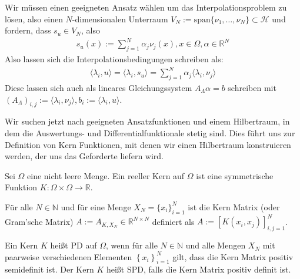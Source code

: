 Wir müssen einen geeigneten Ansatz wählen um das Interpolationsproblem zu lösen, also einen $N$-dimensionalen Unterraum $V_N := \text{span}\{\nu_1, \dots, \nu_N\} \subset \mathcal{H}$ und fordern, dass $s_u \in V_N$, also 
\begin{align*}
s_u(x) := \sum_{j=1}^N \alpha_j \nu_j(x), x \in \Omega, \alpha \in \mathbb{R}^N
\end{align*}
Also lassen sich die Interpolationsbedingungen schreiben als:
\begin{align*}
\langle \lambda_i,u \rangle = \langle \lambda_i,s_u \rangle = \sum_{j=1}^N \alpha_j \langle \lambda_i,\nu_j \rangle
\end{align*}
Diese lassen sich auch als lineares Gleichungssystem $A_\Lambda \alpha = b$ schreiben  mit $(A_\Lambda)_{i,j} := \langle \lambda_i,\nu_j \rangle, b_i := \langle \lambda_i,u \rangle$.

Wir suchen jetzt nach geeigneten Ansatzfunktionen und einem Hilbertraum, in dem die Auswertungs- und Differentialfunktionale stetig sind. Dies führt uns zur Definition von Kern Funktionen, mit denen wir einen Hilbertraum konstruieren werden, der uns das Geforderte liefern wird.

\begin{definition}
\label{Kern}
Sei $\Omega$ eine nicht leere Menge. Ein reeller Kern auf $\Omega$ ist eine symmetrische Funktion $K: \Omega \times \Omega \rightarrow \mathbb{R}$.

Für alle $N \in \mathbb{N}$ und für eine Menge $X_N = \{x_i\}_{i=1}^N$ ist die Kern Matrix (oder Gram'sche Matrix) $A:= A_{K,X_N} \in \mathbb{R}^{N \times N}$  definiert als $A:=[K(x_i, x_j)]_{i,j=1}^N$.

Ein Kern $K$ heißt \ac{PD} auf $\Omega$, wenn für alle $N \in \mathbb{N}$ und alle Mengen $X_N$ mit paarweise verschiedenen Elementen $\left\{x_i\right\}_{i=1}^N$ gilt, dass die Kern Matrix positiv semidefinit ist. Der Kern $K$ heißt \ac{SPD}, falls die Kern Matrix positiv definit ist.
\end{definition}

